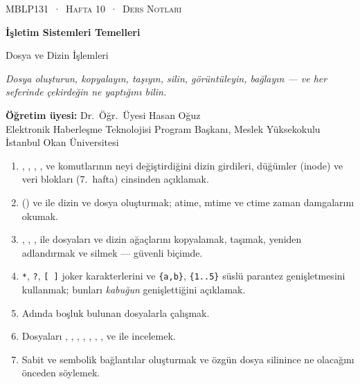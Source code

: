 \setlength{\parskip}{0.45em}
\setlength{\emergencystretch}{3em}
\thispagestyle{empty}
\begin{tcolorbox}[enhanced,colback=dark,colframe=dark,arc=0pt,boxrule=0pt,
  left=18pt,right=18pt,top=20pt,bottom=20pt,coltext=white]
{\small\color{mint}\textsc{MBLP131 \,·\, Hafta 10 \,·\, Ders Notları}}\par\medskip
{\headfont\fontsize{26}{30}\selectfont\bfseries İşletim Sistemleri Temelleri}\par\medskip
{\large Dosya ve Dizin İşlemleri}\par\smallskip
{\small\itshape\color{white!70} Dosya oluşturun, kopyalayın, taşıyın, silin, görüntüleyin, bağlayın --- ve her seferinde çekirdeğin ne yaptığını bilin.}
\end{tcolorbox}

\vspace{0.4em}
\begin{minipage}[t]{0.70\linewidth}
\small
\textbf{Öğretim üyesi:} Dr.\ Öğr.\ Üyesi Hasan Oğuz\\
Elektronik Haberleşme Teknolojisi Program Başkanı, Meslek Yüksekokulu\\
İstanbul Okan Üniversitesi
\end{minipage}

\vspace{0.8em}
\begin{keyidea}
\begin{enumerate}[leftmargin=1.4em]
  \item {}, , , ,  ve  komutlarının neyi değiştirdiğini dizin girdileri, düğümler (inode) ve veri blokları (7.~hafta) cinsinden açıklamak.
  \item {} () ve  ile dizin ve dosya oluşturmak; atime, mtime ve ctime zaman damgalarını okumak.
  \item {}, , ,  ile dosyaları ve dizin ağaçlarını kopyalamak, taşımak, yeniden adlandırmak ve silmek --- güvenli biçimde.
  \item \texttt{*}, \texttt{?}, \texttt{[\,]} joker karakterlerini ve \texttt{\{a,b\}}, \texttt{\{1..5\}} süslü parantez genişletmesini kullanmak; bunları \emph{kabuğun} genişlettiğini açıklamak.
  \item Adında boşluk bulunan dosyalarla çalışmak.
  \item Dosyaları , , , , , , ,  ve  ile incelemek.
  \item Sabit ve sembolik bağlantılar oluşturmak ve özgün dosya silinince ne olacağını önceden söylemek.
\end{enumerate}
\end{keyidea}

